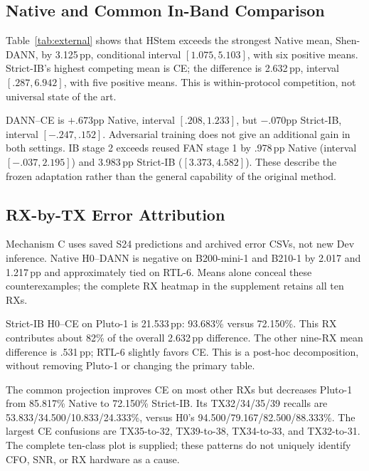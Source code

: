 \documentclass[journal]{IEEEtran}
\begin{document}
\subsection{Native and Common In-Band Comparison}
\begin{table}[t]\centering
\caption{Complete S24 comparison on historically developed RXs. Accuracy/F1 are percentages; accuracy is mean $\pm$ fit SD over six fits. Worst is the minimum RX seed-mean accuracy. Strict-IB ASK is deferred, not zero or failed. HStem is the new CPU inference of frozen weights.}
\label{tab:external}
\end{table}

Table~\ref{tab:external} shows that HStem exceeds the strongest Native mean, Shen-DANN, by 3.125\,pp, conditional interval $[1.075, 5.103]$, with six positive means. Strict-IB's highest competing mean is CE; the difference is 2.632\,pp, interval $[.287, 6.942]$, with five positive means. This is within-protocol competition, not universal state of the art.

DANN--CE is $+.673$pp Native, interval $[.208, 1.233]$, but $-.070$pp Strict-IB, interval $[-.247,.152]$. Adversarial training does not give an additional gain in both settings. IB stage 2 exceeds reused FAN stage 1 by .978\,pp Native (interval $[-.037, 2.195]$) and 3.983\,pp Strict-IB ($[3.373, 4.582]$). These describe the frozen adaptation rather than the general capability of the original method.

\subsection{RX-by-TX Error Attribution}
Mechanism C uses saved S24 predictions and archived error CSVs, not new Dev inference. Native H0--DANN is negative on B200-mini-1 and B210-1 by 2.017 and 1.217\,pp and approximately tied on RTL-6. Means alone conceal these counterexamples; the complete RX heatmap in the supplement retains all ten RXs.



Strict-IB H0--CE on Pluto-1 is 21.533\,pp: 93.683\% versus 72.150\%. This RX contributes about 82\% of the overall 2.632\,pp difference. The other nine-RX mean difference is .531\,pp; RTL-6 slightly favors CE. This is a post-hoc decomposition, without removing Pluto-1 or changing the primary table.

The common projection improves CE on most other RXs but decreases Pluto-1 from 85.817\% Native to 72.150\% Strict-IB. Its TX32/34/35/39 recalls are 53.833/34.500/10.833/24.333\%, versus H0's 94.500/79.167/82.500/88.333\%. The largest CE confusions are TX35-to-32, TX39-to-38, TX34-to-33, and TX32-to-31. The complete ten-class plot is supplied; these patterns do not uniquely identify CFO, SNR, or RX hardware as a cause.
\end{document}
